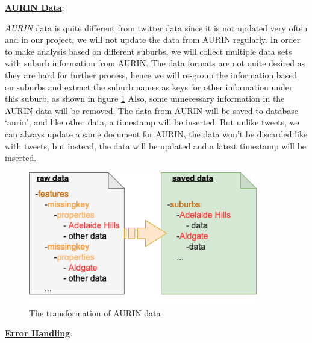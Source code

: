 \documentclass{article}
\begin{document}
\textbf{\underline{AURIN Data}}: 

\textit{AURIN} data is quite different from twitter data since it is not updated very often and in our project, we will not update the data from AURIN regularly. In order to make analysis based on different suburbs, we will collect multiple data sets with suburb information from AURIN. The data formats are not quite desired as they are hard for further process, hence we will re-group the information based on suburbs and extract the suburb names as keys for other information under this suburb, as shown in figure \ref{fig:aurindata} Also, some unnecessary information in the AURIN data will be removed. The data from AURIN will be saved to database ‘aurin’, and like other data, a timestamp will be inserted. But unlike tweets, we can always update a same document for AURIN, the data won’t be discarded like with tweets, but instead, the data will be updated and a latest timestamp will be inserted.
\begin{figure}[htp]
\centering
\includegraphics[width=10cm]{img/aurindata.png}
\caption{The transformation of AURIN data}
\label{fig:aurindata}
\end{figure}

\textbf{\underline{Error Handling}}: 
\end{document}

